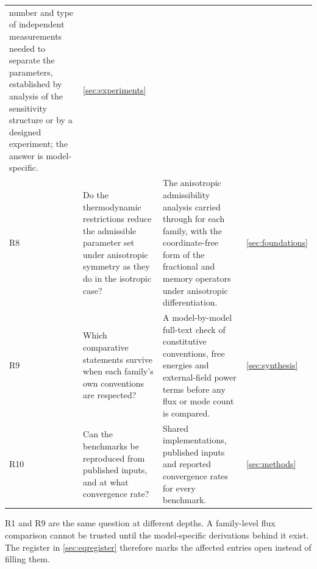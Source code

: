 \begin{table}[H]
\begin{tabularx}{\textwidth}{@{}p{0.5cm}Y Y p{1.75cm}@{}}
  number and type of independent measurements needed to separate the parameters, established by analysis
  of the sensitivity structure or by a designed experiment; the answer is model-specific. &
  \cref{sec:experiments} \\
R8 & Do the thermodynamic restrictions reduce the admissible parameter set under anisotropic symmetry as
  they do in the isotropic case? & The anisotropic admissibility analysis carried through for each family,
  with the coordinate-free form of the fractional and memory operators under anisotropic differentiation.
  & \cref{sec:foundations} \\
R9 & Which comparative statements survive when each family's own conventions are respected? & A
  model-by-model full-text check of constitutive conventions, free energies and external-field power terms
  before any flux or mode count is compared. & \cref{sec:synthesis} \\
R10 & Can the benchmarks be reproduced from published inputs, and at what convergence rate? & Shared
  implementations, published inputs and reported convergence rates for every benchmark. &
  \cref{sec:methods} \\
\bottomrule
\end{tabularx}
\end{table}

R1 and R9 are the same question at different depths. A family-level flux comparison cannot be trusted until the model-specific
derivations behind it exist. The register in \cref{sec:eqregister} therefore marks the affected entries
open instead of filling them.

